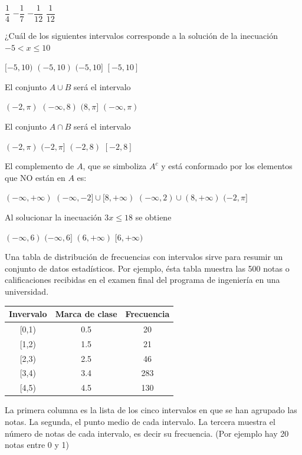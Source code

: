 \documentclass[10pt,letterpaper,addpoints]{exam}
\begin{document}
\begin{multicols}{2}
\begin{questions}
\begin{oneparchoices}
\choice $\dfrac{1}{4}$
\choice $-\dfrac{1}{7}$
\CorrectChoice $-\dfrac{1}{12}$
\choice $\dfrac{1}{12}$
\end{oneparchoices}
\question ¿Cuál de los siguientes intervalos corresponde a la solución de la inecuación $-5<x\leq 10$
\begin{choices}
\choice $[-5,10)$ 
\choice $(-5,10)$
\CorrectChoice $(-5,10]$
\choice $[-5,10]$
\end{choices}
\uplevel{Dados los conjuntos $(-2,8)$ y $B=(-\infty,\pi]$, responda las preguntas \ref{firstq1}--\ref{lastq1}}
\question \label{firstq1} El conjunto $A\cup B$ será el intervalo
\begin{choices}
 \choice $(-2,\pi)$
 \CorrectChoice $(-\infty,8)$
 \choice $(8,\pi]$
 \choice $(-\infty,\pi)$
\end{choices}
\question El conjunto $A \cap B $ será el intervalo
\begin{choices}
 \choice $(-2,\pi)$
 \CorrectChoice $(-2,\pi]$
 \choice $(-2,8)$
 \choice $[-2,8]$
\end{choices}
\question \label{lastq1} El complemento de $A$, que se simboliza $A^{c}$ y está conformado por los elementos que NO están en $A$ es:

\begin{choices}
 \choice $(-\infty,+\infty)$
 \CorrectChoice $(-\infty,-2]\cup [8,+\infty)$
 \choice $(-\infty,2)\cup (8,+\infty)$
 \choice $(-2,\pi]$
\end{choices}
\question Al solucionar la inecuación $3x\leq 18$ se obtiene

\begin{choices}
 \choice $(-\infty,6)$
 \CorrectChoice $(-\infty,6]$
 \choice $(6,+\infty)$
 \choice $[6,+\infty)$
\end{choices}
\begin{uplevel}{
 Una tabla de distribución de frecuencias con intervalos sirve para resumir un conjunto de datos estadísticos. Por ejemplo, ésta tabla muestra las 500 notas o calificaciones recibidas en el examen final del programa de ingeniería en una universidad.
\begin{center}
\begin{tabular}{|c|c|c|}\hline
Invervalo & Marca de clase & Frecuencia\\ \hline
[0,1) & 0.5 & 20\\ \hline
[1,2) & 1.5 & 21\\ \hline
[2,3) & 2.5 & 46\\ \hline
[3,4) & 3.4 & 283\\ \hline
[4,5) & 4.5 & 130\\ \hline
 \end{tabular}
 \end{center}
 La primera columna es la lista de los cinco intervalos en que se han agrupado las notas. La segunda, el punto medio de cada intervalo. La tercera muestra el número de notas de cada intervalo, es decir su frecuencia. (Por ejemplo hay 20 notas entre 0 y 1)
 
}
\end{uplevel}
\end{questions}
\end{multicols}
\end{document}
